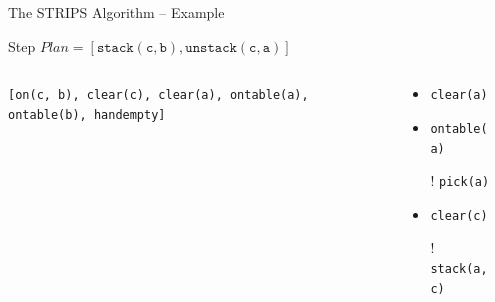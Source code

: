 \documentclass[presentation]{beamer}\mode<presentation>{\usetheme{AMSBolognaFC}}
\begin{document}
\begin{frame}[c]{The STRIPS Algorithm -- Example}
\small

\begin{exampleblock}{Step \nextStripsExampleStep{} \hfill $Plan = [\mathtt{stack(c,b),unstack(c,a)}]$}
	\begin{columns}[t]
		\begin{column}{.30\linewidth}\centering
			\texttt{[on(c, b), clear(c), \alert{clear(a)}, ontable(a), ontable(b), handempty]}
		\end{column}
		\begin{column}{.50\linewidth}\centering
			\begin{itemize}
			    \item \alert{\texttt{clear(a)}}
				\item \texttt{ontable(a)}
				\item[!] \texttt{pick(a)}
				\item \texttt{clear(c)}
				\item[!] \texttt{stack(a,c)}
			\end{itemize}
		\end{column}
		\begin{column}{.10\linewidth}\centering
			
		\end{column}
	\end{columns}
\end{exampleblock}

\end{frame}
\end{document}
